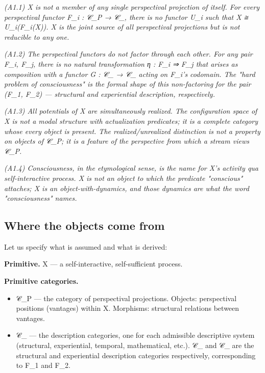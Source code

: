 \documentclass[11pt, openany]{book}
\begin{document}
\textit{(A1.1) X is not a member of any single perspectival projection of itself. For every perspectival functor F\_\allowbreak{}i : 𝒞\_\allowbreak{}P → 𝒞\_, there is no functor U\_\allowbreak{}i such that X ≅ U\_\allowbreak{}i(F\_\allowbreak{}i(X)). X is the joint source of all perspectival projections but is not reducible to any one.}

\textit{(A1.2) The perspectival functors do not factor through each other. For any pair F\_\allowbreak{}i, F\_\allowbreak{}j, there is no natural transformation η : F\_\allowbreak{}i ⇒ F\_\allowbreak{}j that arises as composition with a functor G : 𝒞\_ → 𝒞\_ acting on F\_\allowbreak{}i's codomain. The "hard problem of consciousness" is the formal shape of this non-factoring for the pair (F\_\allowbreak{}1, F\_\allowbreak{}2) --- structural and experiential description, respectively.}

\textit{(A1.3) All potentials of X are simultaneously realized. The configuration space of X is not a modal structure with actualization predicates; it is a complete category whose every object is present. The realized/unrealized distinction is not a property on objects of 𝒞\_\allowbreak{}P; it is a feature of the perspective from which a stream views 𝒞\_\allowbreak{}P.}

\textit{(A1.4) Consciousness, in the etymological sense, is the name for X's activity qua self-interactive process. X is not an object to which the predicate "conscious" attaches; X is an object-with-dynamics, and those dynamics are what the word "consciousness" names.}

\subsection{Where the objects come from}

Let us specify what is assumed and what is derived:

\textbf{Primitive.} X --- a self-interactive, self-sufficient process.

\textbf{Primitive categories.}
\begin{itemize}
\item 𝒞\_\allowbreak{}P --- the category of perspectival projections. Objects: perspectival positions (vantages) within X. Morphisms: structural relations between vantages.
\item 𝒞\_ --- the description categories, one for each admissible descriptive system (structural, experiential, temporal, mathematical, etc.). 𝒞\_ and 𝒞\_ are the structural and experiential description categories respectively, corresponding to F\_\allowbreak{}1 and F\_\allowbreak{}2.
\end{itemize}
\end{document}

